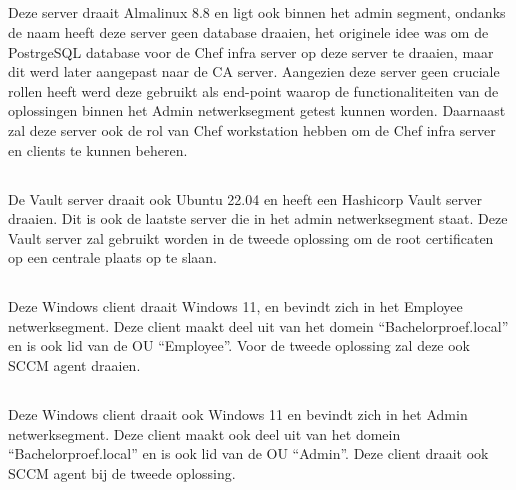\subsection{}
\label{subsec:Database}

Deze server draait Almalinux 8.8 en ligt ook binnen het admin segment, ondanks de naam heeft deze server geen database draaien, het originele idee was om de PostrgeSQL database voor de Chef infra server op deze server te draaien, maar dit werd later aangepast naar de CA server.
Aangezien deze server geen cruciale rollen heeft werd deze gebruikt als end-point waarop de functionaliteiten van de oplossingen binnen het Admin netwerksegment getest kunnen worden.
Daarnaast zal deze server ook de rol van Chef workstation hebben om de Chef infra server en clients te kunnen beheren.

\subsection{}
\label{subsec:Vault}

De Vault server draait ook Ubuntu 22.04 en heeft een Hashicorp Vault server draaien. Dit is ook de laatste server die in het admin netwerksegment staat.
Deze Vault server zal gebruikt worden in de tweede oplossing om de root certificaten op een centrale plaats op te slaan.

\subsection{}
\label{subsec:Employee-client}

Deze Windows client draait Windows 11, en bevindt zich in het Employee netwerksegment. Deze client maakt deel uit van het domein ``Bachelorproef.local'' en is ook lid van de OU ``Employee''.
Voor de tweede oplossing zal deze ook SCCM agent draaien.

\subsection{}
\label{subsec:Admin-client}

Deze Windows client draait ook Windows 11 en bevindt zich in het Admin netwerksegment. Deze client maakt ook deel uit van het domein ``Bachelorproef.local'' en is ook lid van de OU ``Admin''.
Deze client draait ook SCCM agent bij de tweede oplossing.

